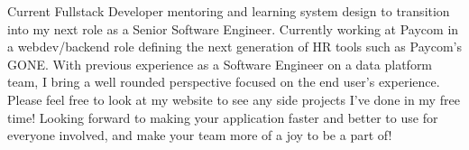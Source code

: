 Current Fullstack Developer mentoring and learning system design to transition into my next role as a Senior Software Engineer. Currently working at Paycom in a webdev/backend role defining the next generation of HR tools such as Paycom's GONE\textregistered. With previous experience as a Software Engineer on a data platform team, I bring a well rounded perspective focused on the end user's experience. Please feel free to look at my website to see any side projects I've done in my free time! Looking forward to making your application faster and better to use for everyone involved, and make your team more of a joy to be a part of!